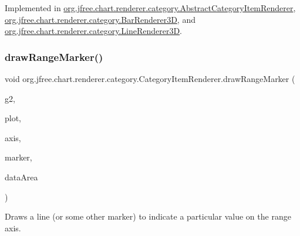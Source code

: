 Implemented in \mbox{\hyperlink{classorg_1_1jfree_1_1chart_1_1renderer_1_1category_1_1_abstract_category_item_renderer_a453a50c55488a841c5a799947d735397}{org.\+jfree.\+chart.\+renderer.\+category.\+Abstract\+Category\+Item\+Renderer}}, \mbox{\hyperlink{classorg_1_1jfree_1_1chart_1_1renderer_1_1category_1_1_bar_renderer3_d_a97ecf7ab62332a7798f9164b17c0970a}{org.\+jfree.\+chart.\+renderer.\+category.\+Bar\+Renderer3D}}, and \mbox{\hyperlink{classorg_1_1jfree_1_1chart_1_1renderer_1_1category_1_1_line_renderer3_d_a75172b3218b41b1b59b104a69a2c7736}{org.\+jfree.\+chart.\+renderer.\+category.\+Line\+Renderer3D}}.

\mbox{\label{interfaceorg_1_1jfree_1_1chart_1_1renderer_1_1category_1_1_category_item_renderer_a5dae81a98a7bfe3e3c68bef3d8e7b225}} 
\subsubsection{\texorpdfstring{draw\+Range\+Marker()}{drawRangeMarker()}}
{\footnotesize\ttfamily void org.\+jfree.\+chart.\+renderer.\+category.\+Category\+Item\+Renderer.\+draw\+Range\+Marker (\begin{DoxyParamCaption}\item[{Graphics2D}]{g2,  }\item[{\mbox{\hyperlink{classorg_1_1jfree_1_1chart_1_1plot_1_1_category_plot}{Category\+Plot}}}]{plot,  }\item[{\mbox{\hyperlink{classorg_1_1jfree_1_1chart_1_1axis_1_1_value_axis}{Value\+Axis}}}]{axis,  }\item[{\mbox{\hyperlink{classorg_1_1jfree_1_1chart_1_1plot_1_1_marker}{Marker}}}]{marker,  }\item[{Rectangle2D}]{data\+Area }\end{DoxyParamCaption})}

Draws a line (or some other marker) to indicate a particular value on the range axis.



